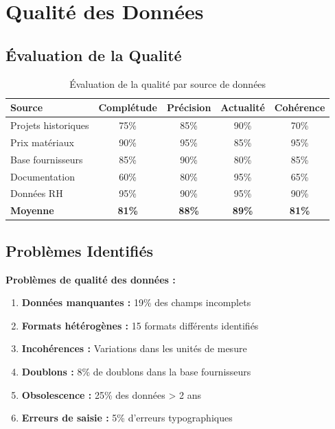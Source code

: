 \documentclass[12pt, a4paper]{report}
\begin{document}
\section{Qualité des Données}

\subsection{Évaluation de la Qualité}

\begin{table}[h]
\centering
\caption{Évaluation de la qualité par source de données}
\begin{tabular}{|l|c|c|c|c|}
\hline
\textbf{Source} & \textbf{Complétude} & \textbf{Précision} & \textbf{Actualité} & \textbf{Cohérence} \\
\hline
Projets historiques & 75\% & 85\% & 90\% & 70\% \\
\hline
Prix matériaux & 90\% & 95\% & 85\% & 95\% \\
\hline
Base fournisseurs & 85\% & 90\% & 80\% & 85\% \\
\hline
Documentation & 60\% & 80\% & 95\% & 65\% \\
\hline
Données RH & 95\% & 90\% & 95\% & 90\% \\
\hline
\textbf{Moyenne} & \textbf{81\%} & \textbf{88\%} & \textbf{89\%} & \textbf{81\%} \\
\hline
\end{tabular}
\end{table}

\subsection{Problèmes Identifiés}

\begin{warningbox}
\textbf{Problèmes de qualité des données :}
\begin{enumerate}
    \item \textbf{Données manquantes :} 19\% des champs incomplets
    \item \textbf{Formats hétérogènes :} 15 formats différents identifiés
    \item \textbf{Incohérences :} Variations dans les unités de mesure
    \item \textbf{Doublons :} 8\% de doublons dans la base fournisseurs
    \item \textbf{Obsolescence :} 25\% des données > 2 ans
    \item \textbf{Erreurs de saisie :} 5\% d'erreurs typographiques
\end{enumerate}
\end{warningbox}
\end{document}
